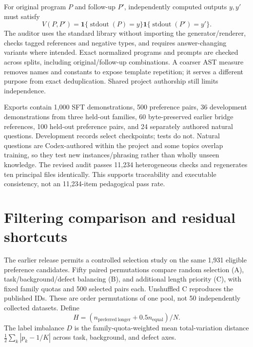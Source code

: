 For original program $P$ and follow-up $P'$, independently computed outputs $y,y'$ must satisfy
\begin{equation}
V(P,P')=\mathbf1\{\operatorname{stdout}(P)=y\}\mathbf1\{\operatorname{stdout}(P')=y'\}.
\label{eq:data-exec}
\end{equation}
The auditor uses the standard library without importing the generator/renderer, checks tagged references and negative types, and requires answer-changing variants where intended. Exact normalized programs and prompts are checked across splits, including original/follow-up combinations. A coarser AST measure removes names and constants to expose template repetition; it serves a different purpose from exact deduplication. Shared project authorship still limits independence.

Exports contain 1,000 SFT demonstrations, 500 preference pairs, 36 development demonstrations from three held-out families, 60 byte-preserved earlier bridge references, 100 held-out preference pairs, and 24 separately authored natural questions. Development records select checkpoints; tests do not. Natural questions are Codex-authored within the project and some topics overlap training, so they test new instances/phrasing rather than wholly unseen knowledge. The revised audit passes 11,234 heterogeneous checks and regenerates ten principal files identically. This supports traceability and executable consistency, not an 11,234-item pedagogical pass rate.

\section{Filtering comparison and residual shortcuts}
The earlier release permits a controlled selection study on the same 1,931 eligible preference candidates. Fifty paired permutations compare random selection (A), task/background/defect balancing (B), and additional length priority (C), with fixed family quotas and 500 selected pairs each. Unshuffled C reproduces the published IDs. These are order permutations of one pool, not 50 independently collected datasets. Define
\begin{equation}
H=(n_{\mathrm{preferred\ longer}}+0.5n_{\mathrm{equal}})/N.
\label{eq:data-heuristic}
\end{equation}
The label imbalance $D$ is the family-quota-weighted mean total-variation distance $\frac12\sum_k|p_k-1/K|$ across task, background, and defect axes.

